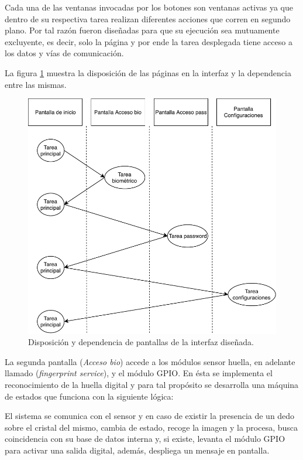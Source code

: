 Cada una de las ventanas invocadas por los botones son ventanas activas ya que dentro de su respectiva tarea realizan diferentes acciones que corren en segundo plano. Por tal razón fueron diseñadas para que su ejecución sea mutuamente excluyente, es decir, solo la página y por ende la tarea desplegada tiene acceso a los datos y vías de comunicación.

La figura \ref{fig:paginas} muestra la disposición de las páginas en la interfaz y la dependencia entre las mismas.

\begin{figure}[H]
	\centering
	\includegraphics[scale=.7]{./Figures/paginas.pdf}
	\caption{Disposición y dependencia de pantallas de la interfaz diseñada.}
	\label{fig:paginas}
\end{figure}

La segunda pantalla (\textit{Acceso bio}) accede a los módulos sensor huella, en adelante llamado (\textit{fingerprint service}), y el módulo GPIO. En ésta se implementa el reconocimiento de la huella digital y para tal propósito se desarrolla una máquina de estados que funciona con la siguiente lógica:

El sistema se comunica con el sensor y  en caso de existir la presencia de un dedo sobre el cristal del mismo, cambia de estado, recoge la imagen y la procesa, busca coincidencia con su base de datos interna  y, si existe, levanta el módulo GPIO para activar una salida digital, además, despliega un mensaje en pantalla. 

